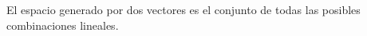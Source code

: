 \documentclass[preview]{standalone}
\begin{document}
\begin{center}
El espacio generado por dos vectores es el conjunto de todas las posibles combinaciones lineales.
\end{center}
\end{document}
